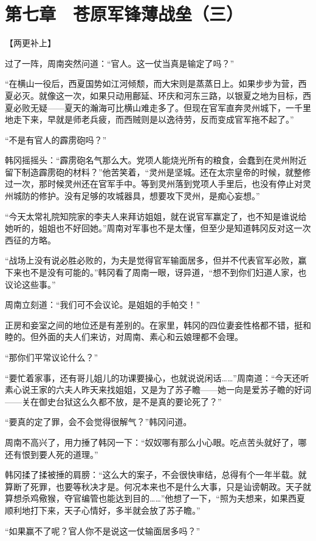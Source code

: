 \section{第七章　苍原军锋薄战垒（三）}

【两更补上】

过了一阵，周南突然问道：“官人。这一仗当真是输定了吗？”

“在横山一役后，西夏国势如江河倾颓，而大宋则是蒸蒸日上。如果步步为营，西夏必灭。就像这一次，如果只动用鄜延、环庆和河东三路，以银夏之地为目标，西夏必败无疑——夏天的瀚海可比横山难走多了。但现在官军直奔灵州城下，一千里地走下来，早就是师老兵疲，而西贼则是以逸待劳，反而变成官军拖不起了。”

“不是有官人的霹雳砲吗？”

韩冈摇摇头：“霹雳砲名气那么大。党项人能烧光所有的粮食，会蠢到在灵州附近留下制造霹雳砲的材料？”他苦笑着，“灵州是坚城。还在太宗皇帝的时候，就整修过一次，那时候灵州还在官军手中。等到灵州落到党项人手里后，也没有停止对灵州城防的修护。没有足够的攻城器具，想要攻下灵州，是痴心妄想。”

“今天太常礼院知院家的李夫人来拜访姐姐，就在说官军赢定了，也不知是谁说给她听的，姐姐也不好回她。”周南对军事也不是太懂，但至少是知道韩冈反对这一次西征的方略。

“战场上没有说必胜必败的，为夫是觉得官军输面居多，但并不代表官军必败，赢下来也不是没有可能的。”韩冈看了周南一眼，讶异道，“想不到你们妇道人家，也议论这些事。”

周南立刻道：“我们可不会议论。是姐姐的手帕交！”

正房和妾室之间的地位还是有差别的。在家里，韩冈的四位妻妾性格都不错，挺和睦的。但外面的夫人们来访，对周南、素心和云娘理都不会理。

“那你们平常议论什么？”

“要忙着家事，还有哥儿姐儿的功课要操心，也就说说闲话……”周南道：“今天还听素心说王家的六夫人昨天来找姐姐，又是为了苏子瞻——她一向是爱苏子瞻的好词——关在御史台狱这么久都不放，是不是真的要论死了？”

“要真的定了罪，会不会觉得很解气？”韩冈问道。

周南不高兴了，用力捶了韩冈一下：“奴奴哪有那么小心眼。吃点苦头就好了，哪还有恨到要人死的道理。”

韩冈揉了揉被捶的肩膀：“这么大的案子，不会很快审结，总得有个一年半载。就算断了死罪，也要等秋决才是。何况本来也不是什么大事，只是讪谤朝政。天子就算想杀鸡儆猴，夺官编管也能达到目的……”他想了一下，“照为夫想来，如果西夏顺利地打下来，天子心情好，多半就会放了苏子瞻。”

“如果赢不了呢？官人你不是说这一仗输面居多吗？”

